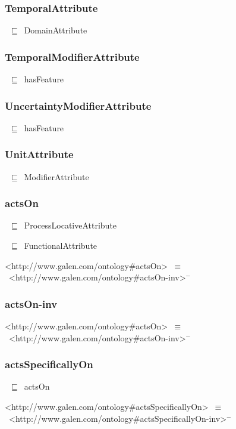 \documentclass{article}
\begin{document}
\subsubsection*{TemporalAttribute}

~\ensuremath{\sqsubseteq}~DomainAttribute

\subsubsection*{TemporalModifierAttribute}

~\ensuremath{\sqsubseteq}~hasFeature

\subsubsection*{UncertaintyModifierAttribute}

~\ensuremath{\sqsubseteq}~hasFeature

\subsubsection*{UnitAttribute}

~\ensuremath{\sqsubseteq}~ModifierAttribute

\subsubsection*{actsOn}

~\ensuremath{\sqsubseteq}~ProcessLocativeAttribute

~\ensuremath{\sqsubseteq}~FunctionalAttribute

<http://www.galen.com/ontology#actsOn>~\ensuremath{\equiv}~<http://www.galen.com/ontology#actsOn-inv>\ensuremath{^-}

\subsubsection*{actsOn-inv}

<http://www.galen.com/ontology#actsOn>~\ensuremath{\equiv}~<http://www.galen.com/ontology#actsOn-inv>\ensuremath{^-}

\subsubsection*{actsSpecificallyOn}

~\ensuremath{\sqsubseteq}~actsOn

<http://www.galen.com/ontology#actsSpecificallyOn>~\ensuremath{\equiv}~<http://www.galen.com/ontology#actsSpecificallyOn-inv>\ensuremath{^-}
\end{document}
